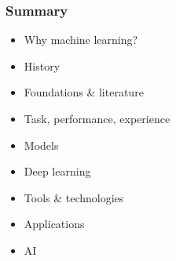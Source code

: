 \documentclass[xcolor={dvipsnames}]{beamer}
\begin{document}
\begin{frame}
  \frametitle{Summary}
  \begin{itemize}
    \item<+-> Why machine learning?
    \item<+-> History
    \item<+-> Foundations \& literature
    \item<+-> Task, performance, experience
    \item<+-> Models
    \item<+-> Deep learning
    \item<+-> Tools \& technologies
    \item<+-> Applications
    \item<+-> AI
  \end{itemize}
\end{frame}
\end{document}
